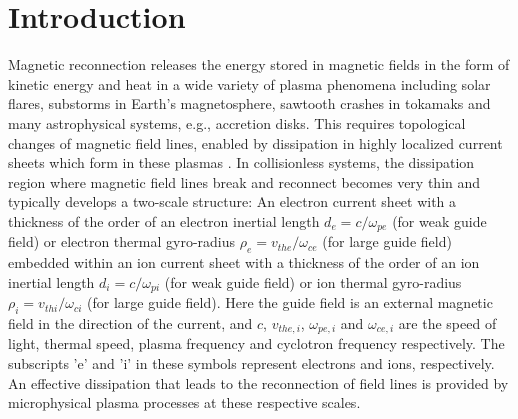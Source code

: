 \documentclass[aip,preprint]{revtex4-1}
\begin{document}

\maketitle

\section{\label{sec:introduction}Introduction}
Magnetic reconnection releases the energy stored in magnetic fields in the form of kinetic energy and heat in a wide variety of plasma phenomena including solar flares, substorms in Earth's magnetosphere, sawtooth crashes in tokamaks and many astrophysical systems, e.g., accretion disks. This requires topological changes of magnetic field lines, enabled by dissipation in highly localized current sheets which form in these plasmas \cite{yamada2010}. In collisionless systems, the dissipation region where magnetic field lines break and reconnect becomes very thin and typically develops a two-scale structure: An electron current sheet with a thickness of the order of an electron inertial length $d_e=c/\omega_{pe}$ (for weak guide field) or electron thermal gyro-radius $\rho_{e}=v_{the}/\omega_{ce}$ (for large guide field) embedded within an ion current sheet with a thickness of the order of an ion inertial length $d_i=c/\omega_{pi}$ (for weak guide field) or ion thermal gyro-radius $\rho_{i}=v_{thi}/\omega_{ci}$ (for large guide field). Here the guide field is an external magnetic field in the direction of the current, and  $c$, $v_{the,i}$, $\omega_{pe,i}$ and $\omega_{ce,i}$  are the speed of light, thermal speed, plasma frequency and cyclotron frequency respectively. The subscripts 'e' and 'i' in these symbols represent electrons and ions, respectively. An effective dissipation that leads to the reconnection of field lines is provided by microphysical plasma processes at these respective scales.
\end{document}
